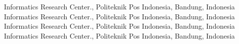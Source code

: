 Informatics Research Center., Politeknik Pos Indonesia, Bandung,
Indonesia
 Informatics Research Center., Politeknik Pos Indonesia, Bandung,
Indonesia
 Informatics Research Center., Politeknik Pos Indonesia, Bandung,
Indonesia
 Informatics Research Center., Politeknik Pos Indonesia, Bandung,
Indonesia
